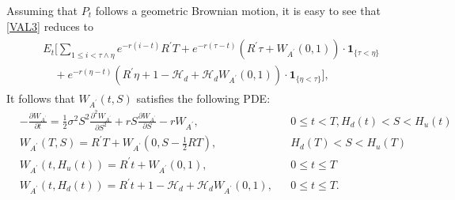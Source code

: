 \documentclass[draft, noinfoline]{ectaart}
\numberwithin{equation}{section}
\theoremstyle{plain}
\begin{document}
Assuming that $P_t$ follows a geometric Brownian motion, it is easy to see that \eqref{VAL3} reduces to 
\begin{align*}
\begin{split} ~& E_{t}\Bigg[\sum_{1\le i<\tau\land\eta}e^{-r(i-t)}R^\prime T+e^{-r(\tau-t)}(R^\prime\tau+W_{A^\prime}(0,1))\cdot\mathbf{1}_{\{\tau<\eta\}}\\
 & \quad+e^{-r(\eta-t)}\left(R^\prime\eta+1-\mathcal{H}_d+\mathcal{H}_d W_{A^\prime}(0,1)\right)\cdot\mathbf{1}_{\{\eta<\tau\}}\Bigg],
\end{split}
\end{align*}
It follows that $W_{A^\prime}(t,S)$ satisfies the following PDE:
\begin{align*}
&-\frac{\partial W_{A^\prime}}{\partial t}  =\frac{1}{2}\sigma^{2}S^{2}\frac{\partial^{2}W_{A^\prime}}{\partial S^{2}}
   +r S\frac{\partial W_{A^\prime}}{\partial S}-r W_{A^\prime}, &&0\le t<T, H_d(t)<S<H_u(t)\\
&W_{A^\prime}(T,S)  =R^\prime T+W_{A^\prime}(0,S-\frac{1}{2}RT),&&H_d(T)<S<H_u(T)\\
&W_{A^\prime}(t,H_{u}(t))  =R^\prime t+W_{A^\prime}(0,1),&&0\le t\le T\\
&W_{A^\prime}(t,H_d(t))  =R^\prime t+1-\mathcal{H}_{d}+\mathcal{H}_{d}W_{A^\prime}(0,1),&&0\le t\le T.
\end{align*}




\end{document}
